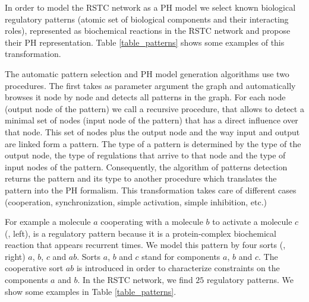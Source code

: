 In order to model the RSTC network as a PH model we select known biological regulatory patterns (atomic set of biological components and their interacting roles), represented 
as biochemical reactions in the RSTC network and propose their PH representation. Table \ref{table_patterns} shows some examples of this transformation. 

The automatic pattern selection and PH model generation algorithms use two procedures. 
%
The first takes as parameter argument the graph and automatically browses it node by node and detects all patterns in the graph. 
For each node (output node of the pattern) we  call a recursive procedure,
that  allows  to detect a minimal set of nodes (input node of the pattern) that has a direct influence over that node. 
This set of nodes plus the output node and the way  input and output are linked form a pattern. 
The type of a pattern is determined by the type of the output node, the type of regulations that arrive to that node and the type of input nodes of the pattern. 
Consequently, the algorithm of patterns detection returns the pattern 
and its type to another procedure  which  translates the pattern into the PH formalism. This transformation  takes care of different cases (cooperation, synchronization, simple activation, simple inhibition, etc.)


For example a molecule $a$ cooperating with a molecule $b$ to activate a molecule $c$ (, left), is a regulatory pattern because it is a protein-complex biochemical reaction that appears recurrent times.  
We model this pattern by four sorts (, right) $a$, $b$, $c$ and $ab$. Sorts $a$, $b$ and $c$
stand for components $a$, $b$ and $c$. The cooperative sort $ab$ is introduced in order to characterize constraints on the components $a$ and $b$.
In the RSTC network, we find  $25$ regulatory patterns. We show some examples in Table \ref{table_patterns}.     %


